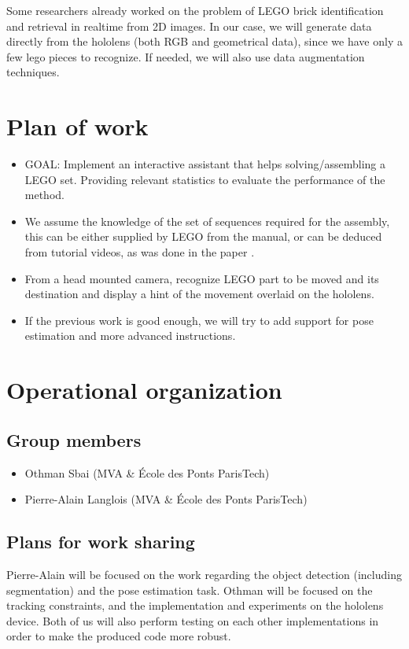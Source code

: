 \documentclass[a4paper,10pt]{article}
\begin{document}
\smallbreak
Some researchers already worked on the problem of LEGO brick identification and retrieval in realtime from 
2D images\cite{botha_realtime_2009}. In our case, we will generate data directly from the hololens (both 
RGB and geometrical data), since we have only a few lego pieces to recognize. If needed, we will also use 
data augmentation techniques. 
 
\section{Plan of work}

\begin{itemize}
 \item GOAL: Implement an interactive assistant that helps solving/assembling a LEGO set. Providing relevant statistics to evaluate the performance of the method.
 \item We assume the knowledge of the set of sequences required for the assembly, this can be either 
 supplied by LEGO from the manual, or can be deduced from tutorial videos, as was done in the paper 
 \cite{alayrac_unsupervised_2015}.
 \item From a head mounted camera, recognize LEGO part to be moved and its destination and display a 
 hint of the movement overlaid on the hololens.
 \item If the previous work is good enough, we will try to add support for pose estimation and more 
 advanced instructions.

\end{itemize}


\section{Operational organization}

\subsection{Group members}

\begin{itemize}
 \item Othman Sbai (MVA \& École des Ponts ParisTech)
 \item Pierre-Alain Langlois (MVA \& École des Ponts ParisTech)
\end{itemize}


\subsection{Plans for work sharing}

Pierre-Alain will be focused on the work regarding the object detection (including segmentation) and the 
pose estimation task.
Othman will be focused on the tracking constraints, and the implementation and experiments on the hololens 
device. Both of us will also perform testing on each other implementations in order to make the produced 
code more robust.




\end{document}
